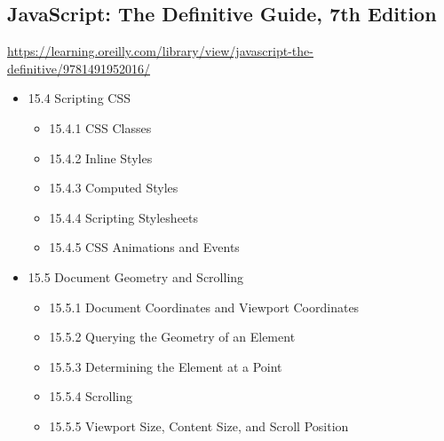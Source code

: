 \begin{mybox}
\section{JavaScript: The Definitive Guide, 7th Edition}
\label{sec:org7ffe811}
\tcblower{}
\url{https://learning.oreilly.com/library/view/javascript-the-definitive/9781491952016/}
\end{mybox}\begin{myitems}
\begin{itemize}
\item 15.4 Scripting CSS
\begin{itemize}
\item 15.4.1 CSS Classes
\item 15.4.2 Inline Styles
\item 15.4.3 Computed Styles
\item 15.4.4 Scripting Stylesheets
\item 15.4.5 CSS Animations and Events
\end{itemize}
\item 15.5 Document Geometry and Scrolling
\begin{itemize}
\item 15.5.1 Document Coordinates and Viewport Coordinates
\item 15.5.2 Querying the Geometry of an Element
\item 15.5.3 Determining the Element at a Point
\item 15.5.4 Scrolling
\item 15.5.5 Viewport Size, Content Size, and Scroll Position
\end{itemize}
\end{itemize}
\end{myitems}
